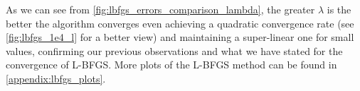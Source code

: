 \noindent As we can see from \autoref{fig:lbfgs_errors_comparison_lambda}, the greater $\lambda$ is the better the algorithm converges even achieving a quadratic convergence rate (see \autoref{fig:lbfgs_1e4_l} for a better view) and maintaining a super-linear one for small values, confirming our previous observations and what we have stated for the convergence of L-BFGS. More plots of the L-BFGS method can be found in \ref{appendix:lbfgs_plots}.
